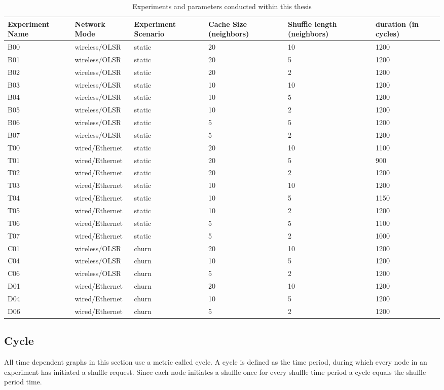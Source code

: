  \begin{table}
\begin{tabular} { |p{2cm}|l|p{1.9cm}|p{2cm}|p{2.5cm}|p{1.9cm}|}
\hline
Experiment Name & Network Mode & Experiment Scenario & Cache Size (neighbors) &
Shuffle length (neighbors) & duration (in cycles)\\
\hline
\hline
B00 & wireless/OLSR & static & 20 & 10 & 1200\\
B01 & wireless/OLSR & static & 20 & 5 & 1200\\
B02 & wireless/OLSR & static & 20 & 2 & 1200\\
B03 & wireless/OLSR & static & 10 & 10 & 1200\\
B04 & wireless/OLSR & static & 10 & 5 & 1200\\
B05 & wireless/OLSR & static & 10 & 2 & 1200\\
B06 & wireless/OLSR & static & 5 & 5 & 1200\\
B07 & wireless/OLSR & static & 5 & 2 & 1200\\
T00 & wired/Ethernet & static & 20 & 10 & 1100\\
T01 & wired/Ethernet & static & 20 & 5 & 900\\
T02 & wired/Ethernet & static & 20 & 2 & 1200\\
T03 & wired/Ethernet & static & 10 & 10 & 1200\\
T04 & wired/Ethernet & static & 10 & 5 & 1150\\
T05 & wired/Ethernet & static & 10 & 2 & 1200\\
T06 & wired/Ethernet & static & 5 & 5 & 1100\\
T07 & wired/Ethernet & static & 5 & 2 & 1000\\
C01 & wireless/OLSR & churn & 20 & 10 & 1200\\
C04 & wireless/OLSR & churn & 10 & 5 & 1200\\
C06 & wireless/OLSR & churn & 5 & 2 & 1200\\
D01 & wired/Ethernet & churn & 20 & 10 & 1200\\
D04 & wired/Ethernet & churn & 10 & 5 & 1200\\
D06 & wired/Ethernet & churn & 5 & 2 & 1200\\
\hline
\end{tabular}
\caption{Experiments and parameters conducted within this thesis}
\label{tab:experiments}
\end{table}
\subsection{Cycle}
All time dependent graphs in this section use a metric called cycle. A cycle
is defined as the time period, during which every node in an experiment has
initiated a shuffle request. Since each node initiates a shuffle once for every shuffle time period a cycle equals the shuffle period time.

